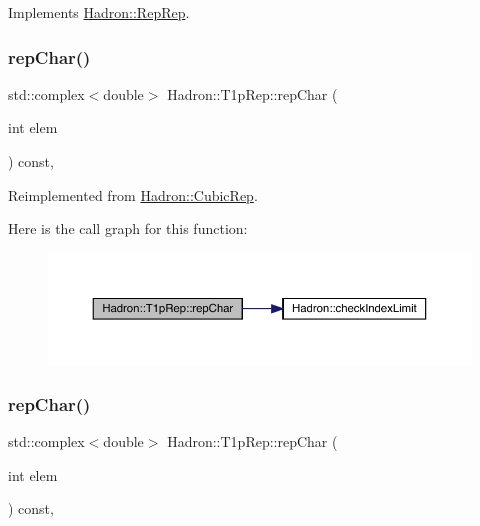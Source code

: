 Implements \mbox{\hyperlink{structHadron_1_1RepRep_ab3213025f6de249f7095892109575fde}{Hadron\+::\+Rep\+Rep}}.

\mbox{\label{structHadron_1_1T1pRep_ad5fd4bf6eaa8fd1a465bd6757d7b4379}} 
\subsubsection{\texorpdfstring{repChar()}{repChar()}\hspace{0.1cm}{\footnotesize\ttfamily [1/2]}}
{\footnotesize\ttfamily std\+::complex$<$double$>$ Hadron\+::\+T1p\+Rep\+::rep\+Char (\begin{DoxyParamCaption}\item[{int}]{elem }\end{DoxyParamCaption}) const\hspace{0.3cm}{\ttfamily [inline]}, {\ttfamily [virtual]}}



Reimplemented from \mbox{\hyperlink{structHadron_1_1CubicRep_af45227106e8e715e84b0af69cd3b36f8}{Hadron\+::\+Cubic\+Rep}}.

Here is the call graph for this function\+:
\nopagebreak
\begin{figure}[H]
\begin{center}
\leavevmode
\includegraphics[width=350pt]{df/dba/structHadron_1_1T1pRep_ad5fd4bf6eaa8fd1a465bd6757d7b4379_cgraph}
\end{center}
\end{figure}
\mbox{\label{structHadron_1_1T1pRep_ad5fd4bf6eaa8fd1a465bd6757d7b4379}} 
\subsubsection{\texorpdfstring{repChar()}{repChar()}\hspace{0.1cm}{\footnotesize\ttfamily [2/2]}}
{\footnotesize\ttfamily std\+::complex$<$double$>$ Hadron\+::\+T1p\+Rep\+::rep\+Char (\begin{DoxyParamCaption}\item[{int}]{elem }\end{DoxyParamCaption}) const\hspace{0.3cm}{\ttfamily [inline]}, {\ttfamily [virtual]}}



